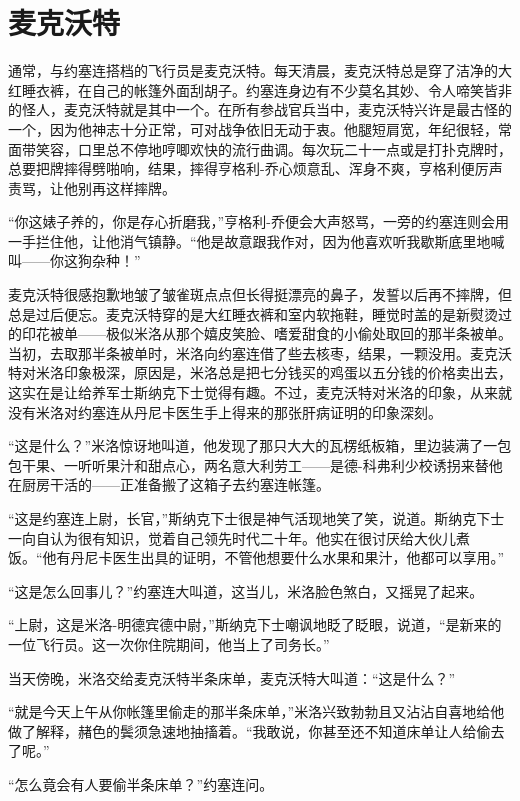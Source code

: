 \chapter{麦克沃特}
 
    通常，与约塞连搭档的飞行员是麦克沃特。每天清晨，麦克沃特总是穿了洁净的大红睡衣裤，在自己的帐篷外面刮胡子。约塞连身边有不少莫名其妙、令人啼笑皆非的怪人，麦克沃特就是其中一个。在所有参战官兵当中，麦克沃特兴许是最古怪的一个，因为他神志十分正常，可对战争依旧无动于衷。他腿短肩宽，年纪很轻，常面带笑容，口里总不停地哼唧欢快的流行曲调。每次玩二十一点或是打扑克牌时，总要把牌摔得劈啪响，结果，摔得亨格利-乔心烦意乱、浑身不爽，亨格利便厉声责骂，让他别再这样摔牌。

    “你这婊子养的，你是存心折磨我，”亨格利-乔便会大声怒骂，一旁的约塞连则会用一手拦住他，让他消气镇静。“他是故意跟我作对，因为他喜欢听我歇斯底里地喊叫——你这狗杂种！”

    麦克沃特很感抱歉地皱了皱雀斑点点但长得挺漂亮的鼻子，发誓以后再不摔牌，但总是过后便忘。麦克沃特穿的是大红睡衣裤和室内软拖鞋，睡觉时盖的是新熨烫过的印花被单——极似米洛从那个嬉皮笑脸、嗜爱甜食的小偷处取回的那半条被单。当初，去取那半条被单时，米洛向约塞连借了些去核枣，结果，一颗没用。麦克沃特对米洛印象极深，原因是，米洛总是把七分钱买的鸡蛋以五分钱的价格卖出去，这实在是让给养军士斯纳克下士觉得有趣。不过，麦克沃特对米洛的印象，从来就没有米洛对约塞连从丹尼卡医生手上得来的那张肝病证明的印象深刻。

    “这是什么？”米洛惊讶地叫道，他发现了那只大大的瓦楞纸板箱，里边装满了一包包干果、一听听果汁和甜点心，两名意大利劳工——是德-科弗利少校诱拐来替他在厨房干活的——正准备搬了这箱子去约塞连帐篷。

    “这是约塞连上尉，长官，”斯纳克下士很是神气活现地笑了笑，说道。斯纳克下士一向自认为很有知识，觉着自己领先时代二十年。他实在很讨厌给大伙儿煮饭。“他有丹尼卡医生出具的证明，不管他想要什么水果和果汁，他都可以享用。”

    “这是怎么回事儿？”约塞连大叫道，这当儿，米洛脸色煞白，又摇晃了起来。

    “上尉，这是米洛-明德宾德中尉，”斯纳克下士嘲讽地眨了眨眼，说道，“是新来的一位飞行员。这一次你住院期间，他当上了司务长。”

    当天傍晚，米洛交给麦克沃特半条床单，麦克沃特大叫道：“这是什么？”

    “就是今天上午从你帐篷里偷走的那半条床单，”米洛兴致勃勃且又沾沾自喜地给他做了解释，赭色的鬓须急速地抽搐着。“我敢说，你甚至还不知道床单让人给偷去了呢。”

    “怎么竟会有人要偷半条床单？”约塞连问。

